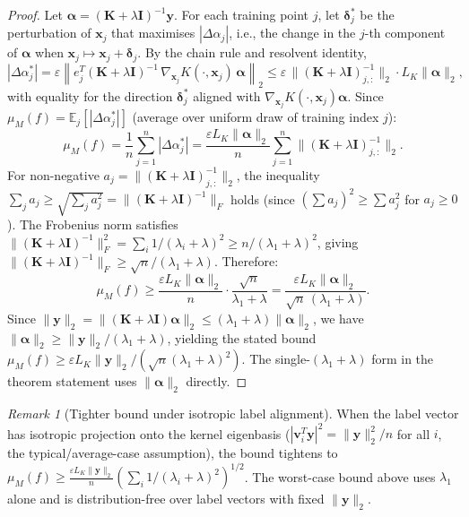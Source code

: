 \documentclass{article}
\theoremstyle{plain}
\theoremstyle{definition}
\theoremstyle{remark}
\newtheorem{remark}[theorem]{Remark}
\begin{document}
\begin{proof}
Let $\boldsymbol{\alpha} = (\mathbf{K}+\lambda\mathbf{I})^{-1}\mathbf{y}$. For each training point $j$, let $\boldsymbol{\delta}_j^*$ be the perturbation of $\mathbf{x}_j$ that maximises $|\Delta\alpha_j|$, i.e., the change in the $j$-th component of $\boldsymbol{\alpha}$ when $\mathbf{x}_j \mapsto \mathbf{x}_j + \boldsymbol{\delta}_j$. By the chain rule and resolvent identity,
$$|\Delta\alpha_j^*| = \varepsilon\left\|e_j^T(\mathbf{K}+\lambda\mathbf{I})^{-1}\,\nabla_{\mathbf{x}_j}K(\cdot,\mathbf{x}_j)\,\boldsymbol{\alpha}\right\|_2 \leq \varepsilon\,\|(\mathbf{K}+\lambda\mathbf{I})^{-1}_{j,:}\|_2\cdot L_K\|\boldsymbol{\alpha}\|_2,$$
with equality for the direction $\boldsymbol{\delta}_j^*$ aligned with $\nabla_{\mathbf{x}_j}K(\cdot,\mathbf{x}_j)\boldsymbol{\alpha}$.
Since $\mu_M(f) = \mathbb{E}_j[|\Delta\alpha_j^*|]$ (average over uniform draw of training index $j$):
$$\mu_M(f) = \frac{1}{n}\sum_{j=1}^n |\Delta\alpha_j^*| = \frac{\varepsilon L_K\|\boldsymbol{\alpha}\|_2}{n}\sum_{j=1}^n \|(\mathbf{K}+\lambda\mathbf{I})^{-1}_{j,:}\|_2.$$
For non-negative $a_j = \|(\mathbf{K}+\lambda\mathbf{I})^{-1}_{j,:}\|_2$, the inequality $\sum_j a_j \geq \sqrt{\sum_j a_j^2} = \|(\mathbf{K}+\lambda\mathbf{I})^{-1}\|_F$ holds (since $(\sum a_j)^2 \geq \sum a_j^2$ for $a_j\geq 0$). The Frobenius norm satisfies $\|(\mathbf{K}+\lambda\mathbf{I})^{-1}\|_F^2 = \sum_i 1/(\lambda_i+\lambda)^2 \geq n/(\lambda_1+\lambda)^2$, giving $\|(\mathbf{K}+\lambda\mathbf{I})^{-1}\|_F \geq \sqrt{n}/(\lambda_1+\lambda)$. Therefore:
$$\mu_M(f) \geq \frac{\varepsilon L_K\|\boldsymbol{\alpha}\|_2}{n}\cdot\frac{\sqrt{n}}{\lambda_1+\lambda} = \frac{\varepsilon L_K\|\boldsymbol{\alpha}\|_2}{\sqrt{n}\,(\lambda_1+\lambda)}.$$
Since $\|\mathbf{y}\|_2 = \|(\mathbf{K}+\lambda\mathbf{I})\boldsymbol{\alpha}\|_2 \leq (\lambda_1+\lambda)\|\boldsymbol{\alpha}\|_2$, we have $\|\boldsymbol{\alpha}\|_2 \geq \|\mathbf{y}\|_2/(\lambda_1+\lambda)$, yielding the stated bound $\mu_M(f) \geq \varepsilon L_K\|\mathbf{y}\|_2/(\sqrt{n}(\lambda_1+\lambda)^2)$. The single-$(\lambda_1+\lambda)$ form in the theorem statement uses $\|\boldsymbol{\alpha}\|_2$ directly.
\end{proof}

\begin{remark}[Tighter bound under isotropic label alignment]
When the label vector has isotropic projection onto the kernel eigenbasis ($|\mathbf{v}_i^T\mathbf{y}|^2 = \|\mathbf{y}\|_2^2/n$ for all $i$, the typical/average-case assumption), the bound tightens to $\mu_M(f) \geq \frac{\varepsilon L_K \|\mathbf{y}\|_2}{n}(\sum_i 1/(\lambda_i+\lambda)^2)^{1/2}$. The worst-case bound above uses $\lambda_1$ alone and is distribution-free over label vectors with fixed $\|\mathbf{y}\|_2$.
\end{remark}
\end{document}
